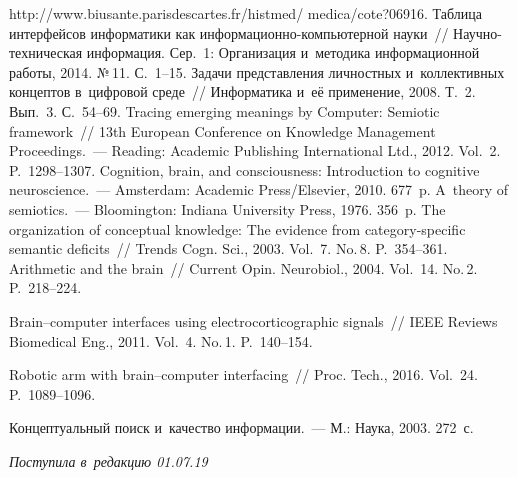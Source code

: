 \begin{multicols}{2}
{{\begin{thebibliography}{99}
{http://www.biusante.parisdescartes.fr/histmed/ medica/cote?06916}.
 Таблица интерфейсов информатики как 
ин\-фор\-ма\-ци\-он\-но-компьютерной науки~// На\-уч\-но-тех\-ни\-че\-ская информация. Сер.~1: 
Организация и~методика информационной работы, 2014. №\,11. С.~1--15.
 Задачи представления 
личностных и~коллективных концептов в~цифровой среде~// Информатика и~её 
применение, 2008. Т.~2. Вып.~3. С.~54--69.
 Tracing emerging meanings by Computer: Semiotic framework~// 
13th European Conference on Knowledge Management Proceedings.~--- Reading: 
Academic Publishing International Ltd., 2012. Vol.~2. P.~1298--1307.
 Cognition, brain, and consciousness: Introduction to 
cognitive neuroscience.~--- Amsterdam: Academic Press/Elsevier, 2010. 677~p.
 A~theory of semiotics.~--- Bloomington: Indiana University Press, 
1976. 356~p.
 The organization of conceptual knowledge: The 
evidence from category-specific semantic deficits~// Trends Cogn. Sci., 
2003. Vol.~7. No.\,8. P.~354--361.
 Arithmetic and the brain~// 
Current Opin. Neurobiol., 2004. Vol.~14. No.\,2. P.~218--224.

 Brain--computer interfaces using 
electrocorticographic signals~// IEEE Reviews Biomedical Eng., 2011. 
Vol.~4. No.\,1. P.~140--154.

 Robotic arm with brain--computer interfacing~// Proc. Tech., 
2016. Vol.~24. P.~1089--1096.

 Концептуальный поиск и~качество информации.~--- М.: 
Наука, 2003. 272~с.
 \end{thebibliography}

 }
 }

\end{multicols}

\vspace*{-9pt}

\hfill{\small\textit{Поступила в~редакцию 01.07.19}}

\vspace*{6pt}



